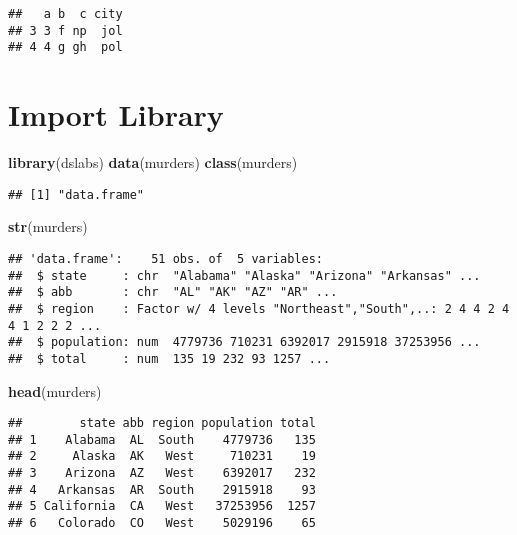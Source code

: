 \documentclass[
]{article}
\newenvironment{Shaded}{\begin{snugshade}}{\end{snugshade}}
\newcommand{\FunctionTok}[1]{\textcolor[rgb]{0.13,0.29,0.53}{\textbf{#1}}}
\newcommand{\NormalTok}[1]{#1}
\begin{document}
\begin{verbatim}
##   a b  c city
## 3 3 f np  jol
## 4 4 g gh  pol
\end{verbatim}

\hypertarget{import-library}{%
\section{Import Library}\label{import-library}}

\begin{Shaded}
\begin{Highlighting}[]
\FunctionTok{library}\NormalTok{(dslabs)}
\FunctionTok{data}\NormalTok{(murders)}
\FunctionTok{class}\NormalTok{(murders)}
\end{Highlighting}
\end{Shaded}

\begin{verbatim}
## [1] "data.frame"
\end{verbatim}

\begin{Shaded}
\begin{Highlighting}[]
\FunctionTok{str}\NormalTok{(murders)}
\end{Highlighting}
\end{Shaded}

\begin{verbatim}
## 'data.frame':    51 obs. of  5 variables:
##  $ state     : chr  "Alabama" "Alaska" "Arizona" "Arkansas" ...
##  $ abb       : chr  "AL" "AK" "AZ" "AR" ...
##  $ region    : Factor w/ 4 levels "Northeast","South",..: 2 4 4 2 4 4 1 2 2 2 ...
##  $ population: num  4779736 710231 6392017 2915918 37253956 ...
##  $ total     : num  135 19 232 93 1257 ...
\end{verbatim}

\begin{Shaded}
\begin{Highlighting}[]
\FunctionTok{head}\NormalTok{(murders)}
\end{Highlighting}
\end{Shaded}

\begin{verbatim}
##        state abb region population total
## 1    Alabama  AL  South    4779736   135
## 2     Alaska  AK   West     710231    19
## 3    Arizona  AZ   West    6392017   232
## 4   Arkansas  AR  South    2915918    93
## 5 California  CA   West   37253956  1257
## 6   Colorado  CO   West    5029196    65
\end{verbatim}
\end{document}
